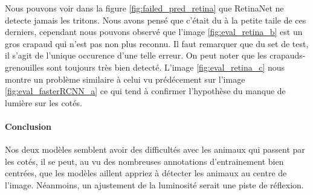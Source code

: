 Nous pouvons voir dans la figure \ref{fig:failed_pred_retina} que RetinaNet ne detecte jamais les tritons. Nous avons pensé que c'était du à la petite taile de ces derniers, cependant nous pouvons observé que l'image \ref{fig:eval_retina_b} est un gros crapaud qui n'est pas non plus reconnu. Il faut remarquer que du set de test, il s'agit de l'unique occurence d'une telle erreur.
On peut noter que les crapauds-grenouilles sont toujours très bien detecté. L'image \ref{fig:eval_retina_c} nous montre un problème similaire à celui vu prédécement sur l'image \ref{fig:eval_fasterRCNN_a} ce qui tend à confirmer l'hypothèse du manque de lumière sur les cotés.
\paragraph{Conclusion} Nos deux modèles semblent avoir des difficultés avec les animaux qui passent par les cotés, il se peut, au vu des nombreuses annotations d'entrainement bien centrées, que les modèles aillent appriez à détecter les animaux au centre de l'image. Néanmoins, un ajustement de la luminosité serait une piste de réflexion.

